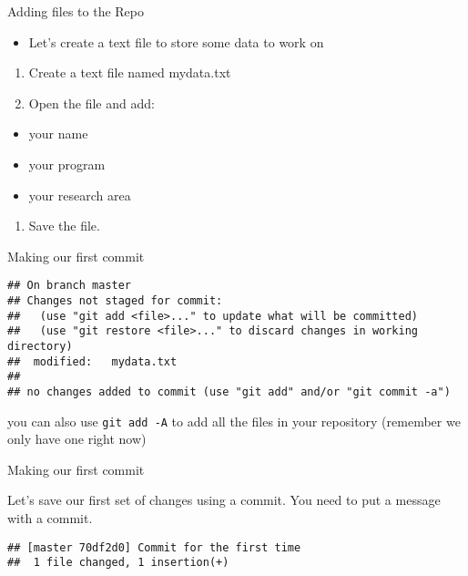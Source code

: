 \documentclass[ignorenonframetext,]{beamer}
\providecommand{\tightlist}{%
  \setlength{\itemsep}{0pt}\setlength{\parskip}{0pt}}
\begin{document}
\begin{frame}{Adding files to the Repo}

\begin{itemize}
\tightlist
\item
  Let's create a text file to store some data to work on
\end{itemize}

\begin{enumerate}
\def\labelenumi{\arabic{enumi}.}
\item
  Create a text file named mydata.txt
\item
  Open the file and add:
\end{enumerate}

\begin{itemize}
\tightlist
\item
  your name
\item
  your program
\item
  your research area
\end{itemize}

\begin{enumerate}
\def\labelenumi{\arabic{enumi}.}
\setcounter{enumi}{2}
\tightlist
\item
  Save the file.
\end{enumerate}

\end{frame}

\begin{frame}[fragile]{Making our first commit}

\begin{verbatim}
## On branch master
## Changes not staged for commit:
##   (use "git add <file>..." to update what will be committed)
##   (use "git restore <file>..." to discard changes in working directory)
##  modified:   mydata.txt
## 
## no changes added to commit (use "git add" and/or "git commit -a")
\end{verbatim}

you can also use \texttt{git\ add\ -A} to add all the files in your
repository (remember we only have one right now)

\end{frame}

\begin{frame}[fragile]{Making our first commit}

Let's save our first set of changes using a commit. You need to put a
message with a commit.

\begin{verbatim}
## [master 70df2d0] Commit for the first time
##  1 file changed, 1 insertion(+)
\end{verbatim}

\end{frame}
\end{document}
